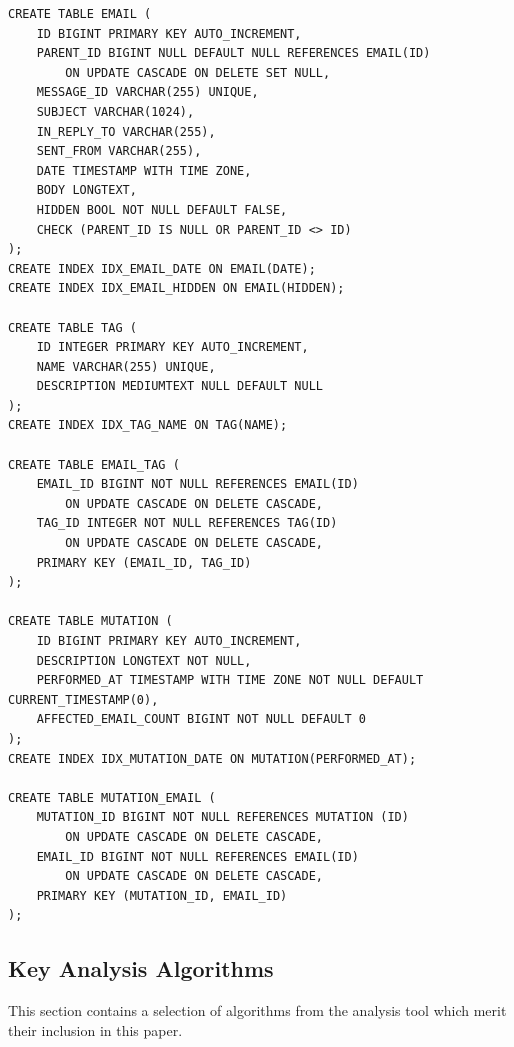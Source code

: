 \documentclass[a4paper, 12pt]{article}
\begin{document}
		\begin{verbatim}
CREATE TABLE EMAIL (
	ID BIGINT PRIMARY KEY AUTO_INCREMENT,
	PARENT_ID BIGINT NULL DEFAULT NULL REFERENCES EMAIL(ID)
		ON UPDATE CASCADE ON DELETE SET NULL,
	MESSAGE_ID VARCHAR(255) UNIQUE,
	SUBJECT VARCHAR(1024),
	IN_REPLY_TO VARCHAR(255),
	SENT_FROM VARCHAR(255),
	DATE TIMESTAMP WITH TIME ZONE,
	BODY LONGTEXT,
	HIDDEN BOOL NOT NULL DEFAULT FALSE,
	CHECK (PARENT_ID IS NULL OR PARENT_ID <> ID)
);
CREATE INDEX IDX_EMAIL_DATE ON EMAIL(DATE);
CREATE INDEX IDX_EMAIL_HIDDEN ON EMAIL(HIDDEN);

CREATE TABLE TAG (
	ID INTEGER PRIMARY KEY AUTO_INCREMENT,
	NAME VARCHAR(255) UNIQUE,
	DESCRIPTION MEDIUMTEXT NULL DEFAULT NULL
);
CREATE INDEX IDX_TAG_NAME ON TAG(NAME);

CREATE TABLE EMAIL_TAG (
	EMAIL_ID BIGINT NOT NULL REFERENCES EMAIL(ID)
		ON UPDATE CASCADE ON DELETE CASCADE,
	TAG_ID INTEGER NOT NULL REFERENCES TAG(ID)
		ON UPDATE CASCADE ON DELETE CASCADE,
	PRIMARY KEY (EMAIL_ID, TAG_ID)
);

CREATE TABLE MUTATION (
	ID BIGINT PRIMARY KEY AUTO_INCREMENT,
	DESCRIPTION LONGTEXT NOT NULL,
	PERFORMED_AT TIMESTAMP WITH TIME ZONE NOT NULL DEFAULT CURRENT_TIMESTAMP(0),
	AFFECTED_EMAIL_COUNT BIGINT NOT NULL DEFAULT 0
);
CREATE INDEX IDX_MUTATION_DATE ON MUTATION(PERFORMED_AT);

CREATE TABLE MUTATION_EMAIL (
	MUTATION_ID BIGINT NOT NULL REFERENCES MUTATION (ID)
		ON UPDATE CASCADE ON DELETE CASCADE,
	EMAIL_ID BIGINT NOT NULL REFERENCES EMAIL(ID)
		ON UPDATE CASCADE ON DELETE CASCADE,
	PRIMARY KEY (MUTATION_ID, EMAIL_ID)
);
		\end{verbatim}
	
	\newpage
	\subsection{Key Analysis Algorithms}
		This section contains a selection of algorithms from the analysis tool which merit their inclusion in this paper.
		
\end{document}
